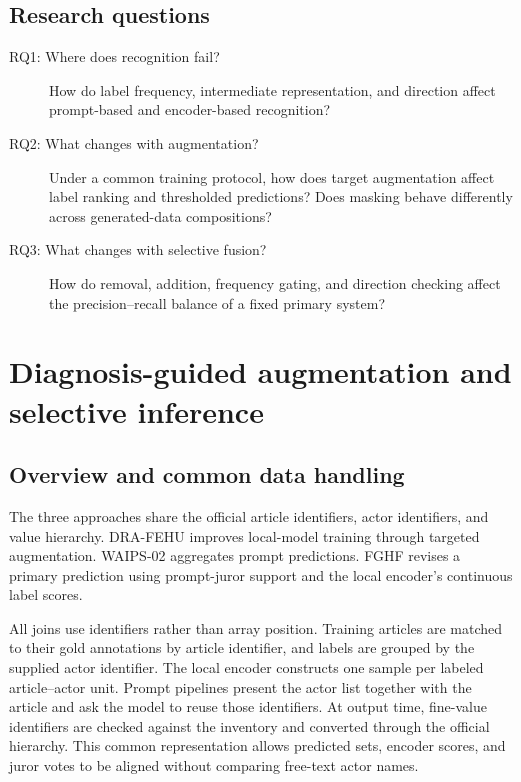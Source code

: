 \documentclass[12pt,a4paper]{article}
\begin{document}
\subsection{Research questions}
\begin{description}
\item[RQ1: Where does recognition fail?] How do label frequency, intermediate representation, and direction affect prompt-based and encoder-based recognition?
\item[RQ2: What changes with augmentation?] Under a common training protocol, how does target augmentation affect label ranking and thresholded predictions? Does masking behave differently across generated-data compositions?
\item[RQ3: What changes with selective fusion?] How do removal, addition, frequency gating, and direction checking affect the precision--recall balance of a fixed primary system?
\end{description}

\sectionbreak

\section{Diagnosis-guided augmentation and selective inference}\label{sec:methods}
\subsection{Overview and common data handling}
The three approaches share the official article identifiers, actor identifiers, and value hierarchy. DRA-FEHU improves local-model training through targeted augmentation. WAIPS-02 aggregates prompt predictions. FGHF revises a primary prediction using prompt-juror support and the local encoder's continuous label scores.

All joins use identifiers rather than array position. Training articles are matched to their gold annotations by article identifier, and labels are grouped by the supplied actor identifier. The local encoder constructs one sample per labeled article--actor unit. Prompt pipelines present the actor list together with the article and ask the model to reuse those identifiers. At output time, fine-value identifiers are checked against the inventory and converted through the official hierarchy. This common representation allows predicted sets, encoder scores, and juror votes to be aligned without comparing free-text actor names.
\end{document}
